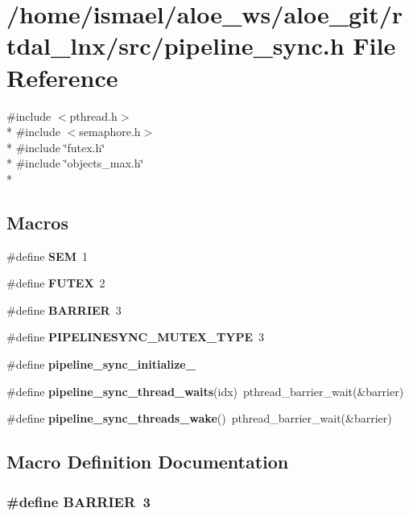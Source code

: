 \section{/home/ismael/aloe\-\_\-ws/aloe\-\_\-git/rtdal\-\_\-lnx/src/pipeline\-\_\-sync.h File Reference}
\label{pipeline__sync_8h}
{\ttfamily \#include $<$pthread.\-h$>$}\\*
{\ttfamily \#include $<$semaphore.\-h$>$}\\*
{\ttfamily \#include \char`\"{}futex.\-h\char`\"{}}\\*
{\ttfamily \#include \char`\"{}objects\-\_\-max.\-h\char`\"{}}\\*
\subsection*{Macros}
\begin{DoxyCompactItemize}
\item 
\#define {\bf S\-E\-M}~1
\item 
\#define {\bf F\-U\-T\-E\-X}~2
\item 
\#define {\bf B\-A\-R\-R\-I\-E\-R}~3
\item 
\#define {\bf P\-I\-P\-E\-L\-I\-N\-E\-S\-Y\-N\-C\-\_\-\-M\-U\-T\-E\-X\-\_\-\-T\-Y\-P\-E}~3
\item 
\#define {\bf pipeline\-\_\-sync\-\_\-initialize\-\_\-}
\item 
\#define {\bf pipeline\-\_\-sync\-\_\-thread\-\_\-waits}(idx)~pthread\-\_\-barrier\-\_\-wait(\&barrier)
\item 
\#define {\bf pipeline\-\_\-sync\-\_\-threads\-\_\-wake}()~pthread\-\_\-barrier\-\_\-wait(\&barrier)
\end{DoxyCompactItemize}


\subsection{Macro Definition Documentation}
\subsubsection[{B\-A\-R\-R\-I\-E\-R}]{\setlength{\rightskip}{0pt plus 5cm}\#define B\-A\-R\-R\-I\-E\-R~3}\label{pipeline__sync_8h_abd39f207af925a92f1d11dd1880bb196}


